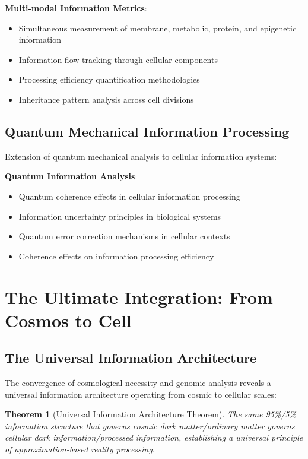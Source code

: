 \documentclass[12pt,a4paper]{article}
\newtheorem{theorem}{Theorem}[section]
\begin{document}
\textbf{Multi-modal Information Metrics}:
\begin{itemize}
\item Simultaneous measurement of membrane, metabolic, protein, and epigenetic information
\item Information flow tracking through cellular components
\item Processing efficiency quantification methodologies
\item Inheritance pattern analysis across cell divisions
\end{itemize}

\subsection{Quantum Mechanical Information Processing}

Extension of quantum mechanical analysis to cellular information systems:

\textbf{Quantum Information Analysis}:
\begin{itemize}
\item Quantum coherence effects in cellular information processing
\item Information uncertainty principles in biological systems
\item Quantum error correction mechanisms in cellular contexts
\item Coherence effects on information processing efficiency
\end{itemize}

\section{The Ultimate Integration: From Cosmos to Cell}

\subsection{The Universal Information Architecture}

The convergence of cosmological-necessity and genomic analysis reveals a universal information architecture operating from cosmic to cellular scales:

\begin{theorem}[Universal Information Architecture Theorem]
The same 95\%/5\% information structure that governs cosmic dark matter/ordinary matter governs cellular dark information/processed information, establishing a universal principle of approximation-based reality processing.
\end{theorem}
\end{document}
